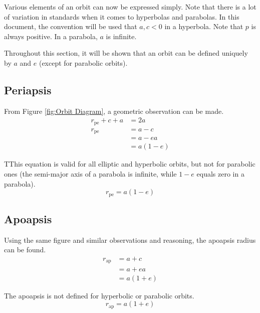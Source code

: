 \documentclass[../main.tex]{subfiles}
\begin{document}
Various elements of an orbit can now be expressed simply. Note that there is a lot of variation in standards when it comes to hyperbolas and parabolas. In this document, the convention will be used that $a, c<0$ in a hyperbola. Note that $p$ is always positive. In a parabola, $a$ is infinite.

Throughout this section, it will be shown that an orbit can be defined uniquely by $a$ and $e$ (except for parabolic orbits).

\bigskip\bigskip
\subsection{Periapsis}\label{sec:Periapsis Geometric}

From Figure \ref{fig:Orbit Diagram}, a geometric observation can be made.
\begin{align*}
    r_\text{pe}+c+a & = 2a     \\
    r_\text{pe}     & =a-c     \\
                    & =a-ea    \\
                    & = a(1-e)
\end{align*}

TThis equation is valid for all elliptic and hyperbolic orbits, but not for parabolic ones (the semi-major axis of a parabola is infinite, while $1-e$ equals zero in a parabola).
\begin{equation}\label{Periapsis Radius Geometric}
    r_\text{pe}=a(1-e)
\end{equation}

\bigskip\bigskip
\subsection{Apoapsis}\label{sec:Apoapsis Geometric}

Using the same figure and similar observations and reasoning, the apoapsis radius can be found.
\begin{align*}
    r_\text{ap} & = a+c   \\
                & =a+ea   \\
                & =a(1+e)
\end{align*}

The apoapsis is not defined for hyperbolic or parabolic orbits.
\begin{equation}\label{Apoapsis Radius Geometric}
    r_\text{ap}=a(1+e)
\end{equation}

\bigskip\bigskip
\end{document}
